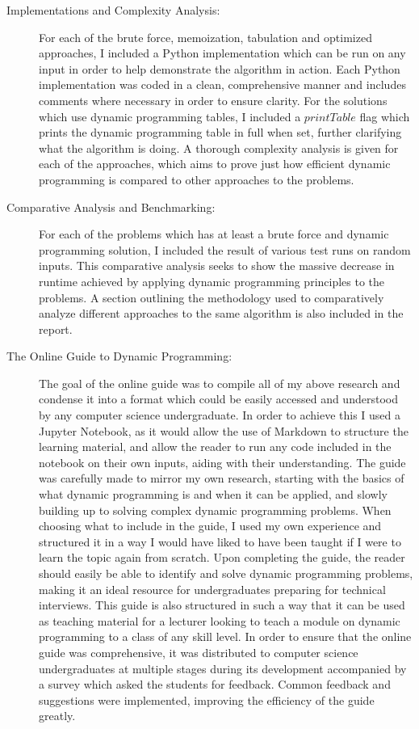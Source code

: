 \begin{description}
    \item[Implementations and Complexity Analysis:]
    For each of the brute force,
    memoization, tabulation and optimized approaches,
    I included a Python implementation which can be run on any input in order to help demonstrate the algorithm in action.
    Each Python implementation was coded in a clean, comprehensive manner and includes comments where necessary in order to ensure clarity.
    For the solutions which use dynamic programming tables, I included a $printTable$ flag which prints the dynamic programming table in full when set, further clarifying what the algorithm is doing.
    A thorough complexity analysis is given for each of the approaches, which aims to prove just how efficient dynamic programming is compared to other approaches to the problems.
    
    \item[Comparative Analysis and Benchmarking:]
    For each of the problems which has at least a brute force and dynamic programming solution, I included the result of various test runs on random inputs.
    This comparative analysis seeks to show the massive decrease in runtime achieved by applying dynamic programming principles to the problems.
    A section outlining the methodology used to comparatively analyze different approaches to the same algorithm is also included in the report.
    
    \item[The Online Guide to Dynamic Programming:]
    The goal of the online guide was to compile all of my above research and condense it into a format which could be easily accessed and understood by any computer science undergraduate.
    In order to achieve this I used a Jupyter Notebook, as it would allow the use of Markdown to structure the learning material,
    and allow the reader to run any code included in the notebook on their own inputs, aiding with their understanding.
    The guide was carefully made to mirror my own research, starting with the basics of what dynamic programming is and when it can be applied, and slowly building up to solving complex dynamic programming problems.
    When choosing what to include in the guide, I used my own experience and structured it in a way I would have liked to have been taught if I were to learn the topic again from scratch.
    Upon completing the guide, the reader should easily be able to identify and solve dynamic programming problems, making it an ideal resource for undergraduates preparing for technical interviews.
    This guide is also structured in such a way that it can be used as teaching material for a lecturer looking to teach a module on dynamic programming to a class of any skill level.
    In order to ensure that the online guide was comprehensive, it was distributed to computer science undergraduates at multiple stages during its development accompanied by a survey which asked the students for feedback.
    Common feedback and suggestions were implemented, improving the efficiency of the guide greatly.
    

\end{description}
